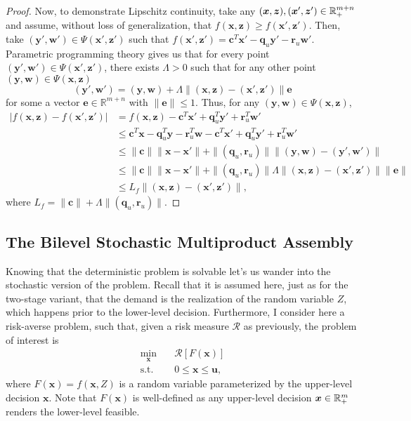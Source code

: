 \documentclass[12pt]{article}
\begin{document}
\begin{proof}
    Now, to demonstrate Lipschitz continuity, take any $(\bm{x},\bm{z}),(\bm{x}',\bm{z}') \in \mathbb{R}^{m+n}_{+}$ and assume, without loss of generalization, that $f(\bm{x},\bm{z})\ge f(\bm{x}',\bm{z}')$.
    Then, take $(\bm{y}',\bm{w}') \in \Psi(\bm{x}',\bm{z}')$ such that $f(\bm{x}',\bm{z}') =  \bm{c}^{T}\bm{x}' - \bm{q}_u \bm{y}' -\bm{r}_u \bm{w}'$.
    Parametric programming theory \citep[Lemma~4.1]{klatteErrorBoundsSolutions1995} gives us that for every point $(\bm{y}',\bm{w}')\in \Psi(\bm{x}',\bm{z}')$, there exists $\Lambda > 0$ such that for any other point $(\bm{y},\bm{w})\in \Psi(\bm{x},\bm{z})$ \[
	(\bm{y}',\bm{w}') = (\bm{y},\bm{w}) + \Lambda \| (\bm{x},\bm{z})-(\bm{x}',\bm{z}') \| \bm{e}
    \] for some a vector $\bm{e} \in \mathbb{R}^{m+n}$ with $\|\bm{e}\|\le 1$.
    Thus, for any $(\bm{y},\bm{w}) \in \Psi(\bm{x},\bm{z})$,
    \begin{align*}
	|f(\bm{x},\bm{z})-f(\bm{x}',\bm{z}')| &= f(\bm{x},\bm{z}) - \bm{c}^{T}\bm{x}' + \bm{q}_u^{T} \bm{y}' + \bm{r}_u^{T} \bm{w}' \\
			  &\le \bm{c}^{T} \bm{x} - \bm{q}_u^{T} \bm{y} - \bm{r}_u^{T} \bm{w}  - \bm{c}^{T}\bm{x}' + \bm{q}_u^{T} \bm{y}' + \bm{r}_u^{T} \bm{w}' \\
			  &\le  \|\bm{c}\| \|\bm{x}-\bm{x}'\| + \|(\bm{q}_u,\bm{r}_u)\| \|(\bm{y},\bm{w})-(\bm{y}',\bm{w}')\| \\
			  &\le  \|\bm{c}\| \|\bm{x}-\bm{x}'\| + \|(\bm{q}_u,\bm{r}_u)\| \Lambda\|(\bm{x},\bm{z})-(\bm{x}',\bm{z}')\| \|\bm{e}\| \\
			  &\le  L_f \|(\bm{x},\bm{z})-(\bm{x}',\bm{z}')\|
    ,\end{align*}
    where $L_f = \|\bm{c}\| + \Lambda \|(\bm{q}_u,\bm{r}_u)\|$.
\end{proof}

\subsection*{The Bilevel Stochastic Multiproduct Assembly}

Knowing that the deterministic problem is solvable let's us wander into the stochastic version of the problem.
Recall that it is assumed here, just as for the two-stage variant, that the demand is the realization of the random variable $Z$, which happens prior to the lower-level decision.
Furthermore, I consider here a risk-averse problem, such that, given a risk measure $\mathcal{R}$ as previously, the problem of interest is
\begin{equation}\label{eq:multiprod-bis-prob}
\begin{split}
    \min_{\bm{x}} \quad & \mathcal{R}[F(\bm{x})] \\
    \textrm{s.t.} \quad & 0\le \bm{x}\le \bm{u}
,\end{split}
\end{equation}
where $F(\bm{x})=f(\bm{x},Z)$ is a random variable parameterized by the upper-level decision $\bm{x}$.
Note that $F(\bm{x})$ is well-defined as any upper-level decision $\bm{x}\in \mathbb{R}^{m}_{+}$ renders the lower-level feasible.
\end{document}
